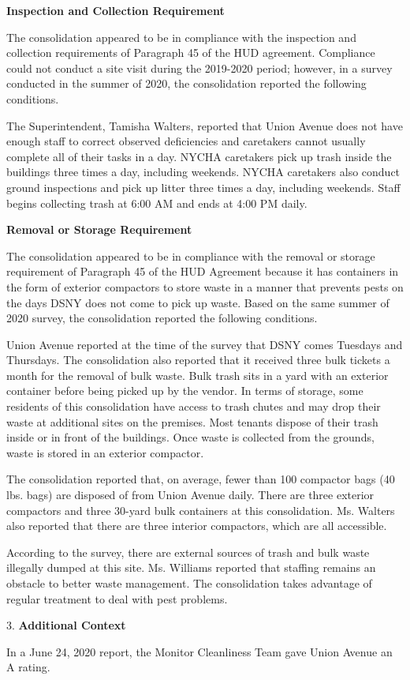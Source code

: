 

\textbf{Inspection and Collection Requirement}

The consolidation appeared to be in compliance with the inspection and collection requirements of Paragraph 45 of the HUD agreement. Compliance could not conduct a site visit during the 2019-2020 period; however, in a survey conducted in the summer of 2020, the consolidation reported the following conditions.

The Superintendent, Tamisha Walters, reported that Union Avenue does not have enough staff to correct observed deficiencies and caretakers cannot usually complete all of their tasks in a day. NYCHA caretakers pick up trash inside the buildings three times a day, including weekends. NYCHA caretakers also conduct ground inspections and pick up litter three times a day, including weekends. Staff begins collecting trash at 6:00 AM and ends at 4:00 PM daily. 

\textbf{Removal or Storage Requirement}

The consolidation appeared to be in compliance with the  removal or storage requirement of Paragraph  45 of the HUD Agreement because it has containers in the form of exterior compactors to store waste in a manner that prevents pests on the days DSNY does not come to pick up waste. Based on the same summer of  2020 survey, the consolidation reported the following conditions.

Union Avenue reported at the time of the survey that DSNY comes Tuesdays and Thursdays. The consolidation also reported that it received three bulk tickets a month for the removal of bulk waste. Bulk trash sits in a yard with an exterior container before being picked up by the vendor. In terms of storage, some residents of this consolidation have access to trash chutes and may drop their waste at additional sites on the premises. Most tenants dispose of their trash inside or in front of the buildings. Once waste is collected from the grounds, waste is stored in an exterior compactor. 

The consolidation reported that, on average, fewer than 100 compactor bags (40 lbs. bags) are disposed of from Union Avenue daily. There are three exterior compactors and three 30-yard bulk containers at this consolidation. Ms. Walters also reported that there are three interior compactors, which are all accessible.

According to the survey, there are external sources of trash and bulk waste illegally dumped at this site. Ms. Williams reported that staffing remains an obstacle to better waste management. The consolidation takes advantage of regular treatment to deal with pest problems.

3. \textbf{Additional Context} 

In a June 24, 2020 report, the Monitor Cleanliness Team gave Union Avenue an A rating. 